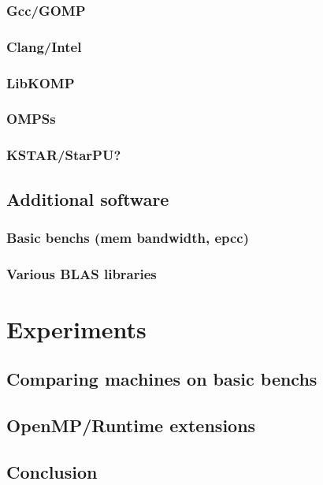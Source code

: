 \subsection{Gcc/GOMP}
\subsection{Clang/Intel}
\subsection{LibKOMP}
\subsection{OMPSs}
\subsection{KSTAR/StarPU?}

\section{Additional software}
\subsection{Basic benchs (mem bandwidth, epcc)}
\subsection{Various BLAS libraries}

\chapter{Experiments}\label{chap:exp:exp}
\chaptertoc


\section{Comparing machines on basic benchs}
\section{OpenMP/Runtime extensions}

\section{Conclusion}

%

